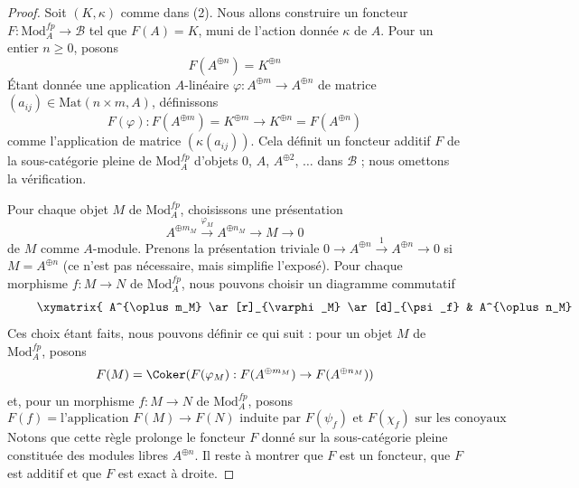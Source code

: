 \begin{proof}
Soit $(K, \kappa)$ comme dans (2). Nous allons construire un foncteur
$F : \text{Mod}^{fp}_A \to \mathcal{B}$ tel que $F(A) = K$,
muni de l'action donnée $\kappa$ de $A$. Pour un
entier $n \geq 0$, posons
$$
F(A^{\oplus n}) = K^{\oplus n}
$$
Étant donnée une application $A$-linéaire $\varphi : A^{\oplus m} \to A^{\oplus n}$
de matrice $(a_{ij}) \in \text{Mat}(n \times m, A)$, définissons
$$
F(\varphi) :
F(A^{\oplus m}) = K^{\oplus m}
\longrightarrow
K^{\oplus n} = F(A^{\oplus n})
$$
comme l'application de matrice $(\kappa(a_{ij}))$. Cela définit un foncteur
additif $F$ de la sous-catégorie pleine de
$\text{Mod}^{fp}_A$ d'objets $0$, $A$, $A^{\oplus 2}$, $\ldots$
dans $\mathcal{B}$ ; nous omettons la vérification.

\medskip\noindent
Pour chaque objet $M$ de $\text{Mod}^{fp}_A$, choisissons une présentation
$$
A^{\oplus m_M} \xrightarrow{\varphi_M} A^{\oplus n_M} \to M \to 0
$$
de $M$ comme $A$-module. Prenons la présentation triviale
$0 \to A^{\oplus n} \xrightarrow{1} A^{\oplus n} \to 0$ si $M = A^{\oplus n}$
(ce n'est pas nécessaire, mais simplifie l'exposé).
Pour chaque morphisme $f : M \to N$ de
$\text{Mod}^{fp}_A$, nous pouvons choisir un diagramme commutatif
\begin{equation}
\label{equation-map}
\vcenter{
\xymatrix{
A^{\oplus m_M} \ar[r]_{\varphi_M} \ar[d]_{\psi_f} &
A^{\oplus n_M} \ar[r] \ar[d]_{\chi_f} &
M \ar[r] \ar[d]_f & 0 \\
A^{\oplus m_N} \ar[r]^{\varphi_N} &
A^{\oplus n_N} \ar[r] &
N \ar[r] & 0
}
}
\end{equation}
Ces choix étant faits, nous pouvons définir ce qui suit : pour un objet
$M$ de $\text{Mod}^{fp}_A$, posons
$$
F(M) = \Coker(F(\varphi_M) : F(A^{\oplus m_M}) \to F(A^{\oplus n_M}))
$$
et, pour un morphisme $f : M \to N$ de $\text{Mod}^{fp}_A$, posons
$$
F(f) = \text{l'application }F(M) \to F(N)\text{ induite par }
F(\psi_f)\text{ et }F(\chi_f)\text{ sur les conoyaux}
$$
Notons que cette règle prolonge le foncteur $F$ donné sur
la sous-catégorie pleine constituée des modules libres $A^{\oplus n}$.
Il reste à montrer que $F$ est un foncteur, que $F$ est additif
et que $F$ est exact à droite.


\end{proof}
